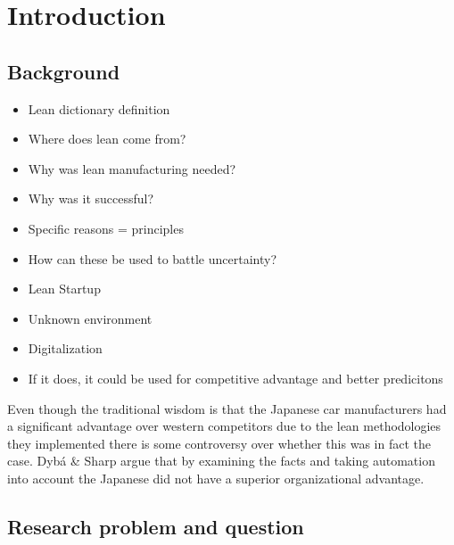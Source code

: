 

\chapter{Introduction}
\label{chapter:intro}

\section{Background}
\label{section:background}

\begin{itemize}
  \item{Lean dictionary definition}
  \item{Where does lean come from?}
  \item{Why was lean manufacturing needed?}
  \item{Why was it successful?}
  \item{Specific reasons = principles}
  \item{How can these be used to battle uncertainty?}
  \item{Lean Startup}
  \item{Unknown environment}
  \item{Digitalization}
  \item{If it does, it could be used for competitive advantage and better predicitons}
\end{itemize}

Even though the traditional wisdom is that the Japanese car manufacturers had a significant advantage over western competitors due to the lean methodologies they implemented there is some controversy over whether this was in fact the case. Dybá \& Sharp argue that by examining the facts and taking automation into account the Japanese did not have a superior organizational advantage. \cite{Dyba2012WhatS}



\cite{2014PhDT82H} \cite{Janes2015Guide} \cite{boes2014agile}

\section{Research problem and question}
\label{section:problem}

